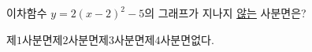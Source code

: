이차함수 $y=2(x-2)^2-5$의 그래프가 지나지 \underline{않는} 사분면은?
\begin{choices32}{제$1$사분면}{제$2$사분면}{제$3$사분면}{제$4$사분면}{없다.}\end{choices32}
